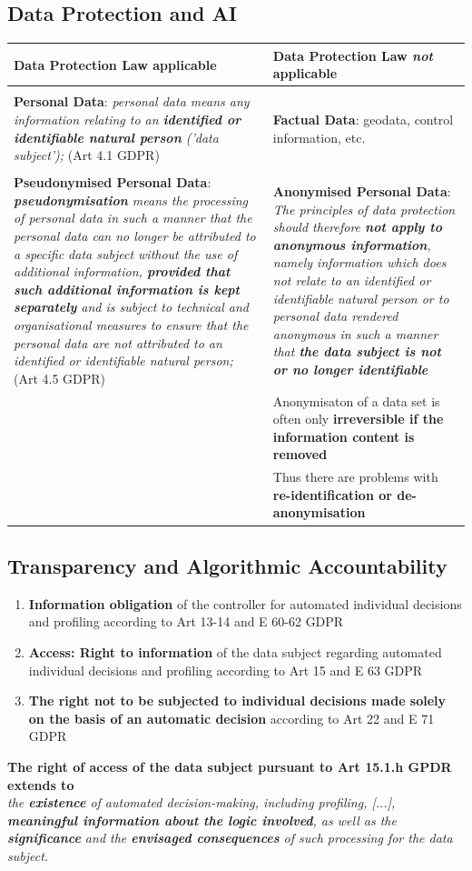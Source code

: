 \documentclass[11pt]{article}
\theoremstyle{definition}
\begin{document}
\subsection{Data Protection and AI}
\begin{tabularx}{\linewidth}{X X}
	\textbf{Data Protection Law applicable} & \textbf{Data Protection Law \emph{not} applicable}\\
	\hline
	&\\[-0.5em]
	\textbf{Personal Data}: \emph{personal data means any information relating to an \textbf{identified or identifiable natural person} ('data subject');} (Art 4.1 GDPR) & \textbf{Factual Data}: geodata, control information, etc.\\
	&\\[-0.5em]
	\textbf{Pseudonymised Personal Data}: \emph{\textbf{pseudonymisation} means the processing of personal data in such a manner that the personal data can no longer be attributed to a specific data subject without the use of additional information, \textbf{provided that such additional information is kept separately} and is subject to technical and organisational measures to ensure that the personal data are not attributed to an identified or identifiable natural person;} (Art 4.5 GDPR) & \textbf{Anonymised Personal Data}: \emph{The principles of data protection should therefore \textbf{not apply to anonymous information}, namely information which does not relate to an identified or identifiable natural person or to personal data rendered anonymous in such a manner that \textbf{the data subject is not or no longer identifiable}}\\
	& Anonymisaton of a data set is often only \textbf{irreversible if the information content is removed}\\
	& Thus there are problems with \textbf{re-identification or de-anonymisation}
\end{tabularx}

\subsection{Transparency and Algorithmic Accountability}
\begin{enumerate}
	\item \textbf{Information obligation} of the controller for automated individual decisions and profiling according to Art 13-14 and E 60-62 GDPR
	\item \textbf{Access: Right to information} of the data subject regarding automated individual decisions and profiling according to Art 15 and E 63 GDPR
	\item \textbf{The right not to be subjected to individual decisions made solely on the basis of an automatic decision} according to Art 22 and E 71 GDPR
\end{enumerate}
\textbf{The right of access of the data subject pursuant to Art 15.1.h GPDR extends to}\\
\emph{the \textbf{existence} of automated decision-making, including profiling, [...], \textbf{meaningful information about the logic involved}, as well as the \textbf{significance} and the \textbf{envisaged consequences} of such processing for the data subject.}
\end{document}
